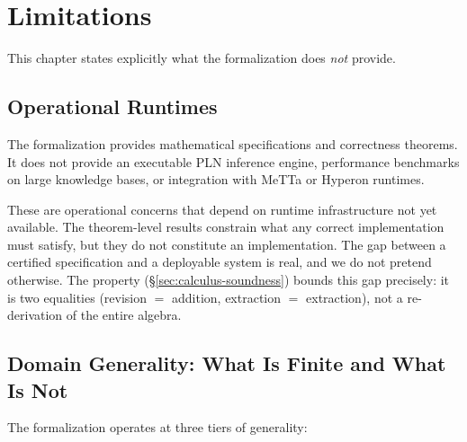 \documentclass[11pt,openany]{report}
\begin{document}



\chapter{Limitations}
\label{ch:limitations}

This chapter states explicitly what the formalization does \emph{not}
provide.

\section{Operational Runtimes}

The formalization provides mathematical specifications and correctness
theorems.  It does not provide an executable PLN inference engine,
performance benchmarks on large knowledge bases, or integration with
MeTTa or Hyperon runtimes.

These are operational concerns that depend on runtime infrastructure
not yet available.  The theorem-level results constrain what any
correct implementation must satisfy, but they do not constitute an
implementation.  The gap between a certified specification and a
deployable system is real, and we do not pretend otherwise.
The  property
(\S\ref{sec:calculus-soundness}) bounds this gap precisely: it
is two equalities (revision $=$ addition, extraction $=$
extraction), not a re-derivation of the entire algebra.

\section{Domain Generality: What Is Finite and What Is Not}

The formalization operates at three tiers of generality:
\end{document}
